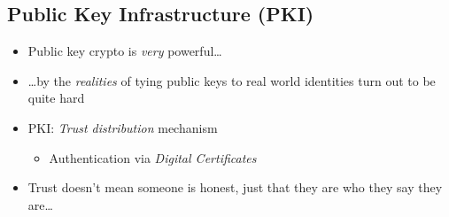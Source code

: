 \subsection{Public Key Infrastructure (PKI)}
\begin{itemize}[nosep]
    \item Public key crypto is \emph{very} powerful\dots
    \item \dots by the \emph{realities} of tying public keys to real world identities turn out to be quite hard
    \item PKI: \emph{Trust distribution} mechanism
          \begin{itemize}[nosep]
              \item Authentication via \emph{Digital Certificates}
          \end{itemize}
    \item Trust doesn't mean someone is honest, just that they are who they say they are\dots
\end{itemize}

